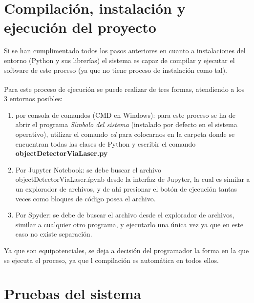 \section{Compilación, instalación y ejecución del proyecto}
Si se han cumplimentado todos los pasos anteriores en cuanto a instalaciones del entorno (Python y sus librerías) el sistema es capaz de compilar y ejecutar el software de este proceso (ya que no tiene proceso de instalación como tal).\\
\\
Para este proceso de ejecución se puede realizar de tres formas, atendiendo a los 3 entornos posibles:
\begin{enumerate}
	\item por consola de comandos (CMD en Windows): para este proceso se ha de abrir el programa \textit{Símbolo del sistema} (instalado por defecto en el sistema operativo), utilizar el comando \textit{cd} para colocarnos en la carpeta donde se encuentran todas las clases de Python y escribir el comando \textbf{objectDetectorViaLaser.py}
	\item Por Jupyter Notebook: se debe buscar el archivo objectDetectorViaLaser.ípynb desde la interfaz de Jupyter, la cual es similar a un explorador de archivos, y de ahi presionar el botón de ejecución tantas veces como bloques de código posea el archivo.
	\item Por Spyder: se debe de buscar el archivo desde el explorador de archivos, similar a cualquier otro programa, y ejecutarlo una única vez ya que en este caso no existe separación. 
\end{enumerate}
Ya que son equipotenciales, se deja a decisión del programador la forma en la que se ejecuta el proceso, ya que l compilación es automática en todos ellos.
\section{Pruebas del sistema}
